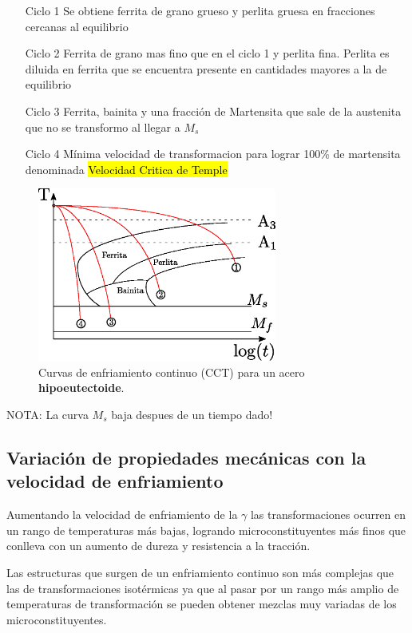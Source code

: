 \documentclass{article}
\begin{document}
\begin{itemize}
    \item[Ciclo 1] Se obtiene ferrita de grano grueso y perlita gruesa en fracciones cercanas al equilibrio
    \item[Ciclo 2] Ferrita de grano mas fino que en el ciclo 1 y perlita fina. Perlita es diluida en ferrita que se encuentra presente en cantidades mayores a la de equilibrio
    \item[Ciclo 3] Ferrita, bainita y una fracción de Martensita que sale de la austenita que no se transformo al llegar a $M_s$
    \item[Ciclo 4] Mínima velocidad de transformacion para lograr 100\% de martensita denominada \hl{Velocidad Critica de Temple}
\end{itemize}

\begin{figure}[htb!]
    \centering
    \includegraphics[width=0.7\textwidth]{fig/CCThipo.eps}
    \caption{Curvas de enfriamiento continuo (CCT) para un acero \textbf{hipoeutectoide}.}
    \label{fig:CCThipo}
\end{figure}

NOTA: La curva $M_s$ baja despues de un tiempo dado!


\subsection{Variación de propiedades mecánicas con la velocidad de enfriamiento}
Aumentando la velocidad de enfriamiento de la $\gamma$ las transformaciones ocurren en un rango de temperaturas más bajas, logrando microconstituyentes más finos que conlleva con un aumento de dureza y resistencia a la tracción. 

Las estructuras que surgen de un enfriamiento continuo son más complejas que las de transformaciones isotérmicas ya que al pasar por un rango más amplio de temperaturas de transformación se pueden obtener mezclas muy variadas de los microconstituyentes.
\end{document}
